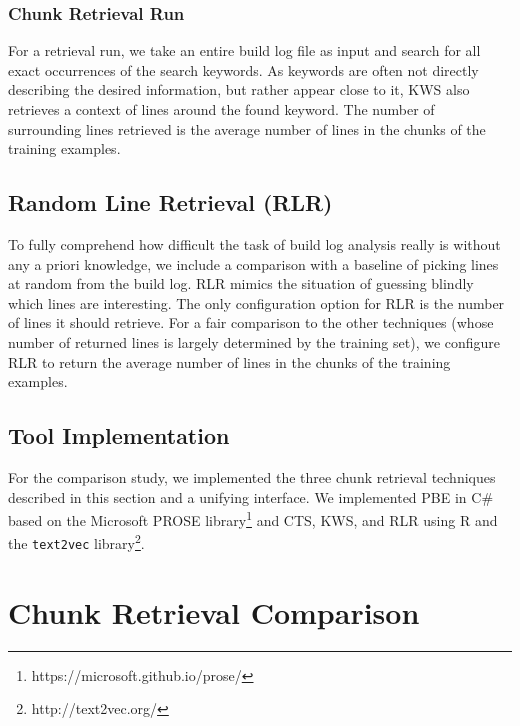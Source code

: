 \subsubsection{Chunk Retrieval Run}
For a retrieval run, we take an entire build log file as input and
search for all exact occurrences of the search keywords.
As keywords are
often not directly describing the desired information, but rather
appear close to it, KWS also retrieves a context of lines
around the found keyword.
The number of surrounding lines retrieved is
the average number of lines in the chunks of the training examples.

\subsection{Random Line Retrieval (RLR)}
\label{sec:expl-rlr}
To fully comprehend how difficult the task of build log analysis really
is without any a priori knowledge, we include a comparison with a
baseline of
picking lines at random from the build log.
RLR mimics the
situation of guessing blindly which lines are interesting.
The only configuration option for RLR is the number of lines it should
retrieve.
For a fair comparison to the other techniques (whose number of
returned lines is largely determined by the training set),
we configure RLR to return the average
number of lines in the chunks of the training examples.

\subsection{Tool Implementation}
For the comparison study, we implemented the three chunk retrieval
techniques described in this section and a unifying interface.
We implemented PBE in C\# based on the Microsoft PROSE
library\footnote{https://microsoft.github.io/prose/}
and CTS, KWS, and RLR using
R and the {\tt text2vec} library\footnote{http://text2vec.org/}.

\section{Chunk Retrieval Comparison}
\label{sec:study}

